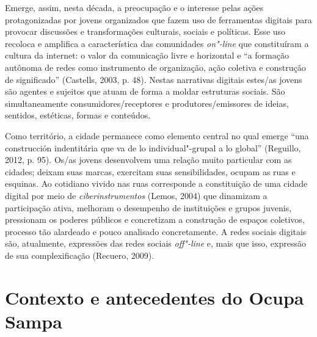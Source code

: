 Emerge, assim, nesta década, a preocupação e o interesse pelas ações
protagonizadas por jovens organizados que fazem uso de ferramentas
digitais para provocar discussões e transformações culturais, sociais e
políticas. Esse uso recoloca e amplifica a característica das
comunidades \emph{on"-line} que constituíram a cultura da internet: o
valor da comunicação livre e horizontal e ``a formação autônoma de redes
como instrumento de organização, ação coletiva e construção de
significado'' (Castells, 2003, p. 48). Nestas narrativas digitais
estes/as jovens são agentes e sujeitos que atuam de forma a moldar
estruturas sociais. São simultaneamente consumidores/receptores e
produtores/emissores de ideias, sentidos, estéticas, formas e conteúdos.

Como território, a cidade permanece como elemento central no qual emerge
``una construcción indentitária que va de lo individual"-grupal a lo
global'' (Reguillo, 2012, p. 95). Os/as jovens desenvolvem uma relação
muito particular com as cidades; deixam suas marcas, exercitam suas
sensibilidades, ocupam as ruas e esquinas. Ao cotidiano vivido nas ruas
corresponde a constituição de uma cidade digital por meio de
\emph{ciberinstrumentos} (Lemos, 2004) que dinamizam a participação
ativa, melhoram o desempenho de instituições e grupos juvenis,
pressionam os poderes públicos e concretizam a construção de espaços
coletivos, processo tão alardeado e pouco analisado concretamente. A
redes sociais digitais são, atualmente, expressões das redes sociais
\emph{off"-line} e, mais que isso, expressão de sua complexificação
(Recuero, 2009).

\section{Contexto e antecedentes do Ocupa Sampa}

